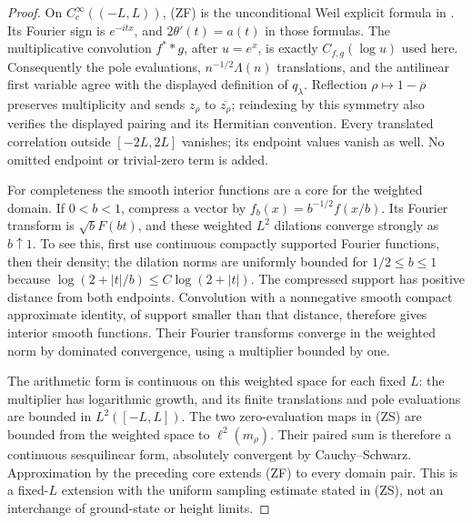 \documentclass[11pt]{article}
\theoremstyle{remark}\newtheorem{remark}[theorem]{Remark}
\begin{document}
\begin{proof}
On $C_c^\infty((-L,L))$, (ZF) is the unconditional Weil
explicit formula in \cite[eqs.~(1.1), (2.2), (2.6),
(2.8)--(2.12), pp.~97, 101--103]{ConnesConsani}.
Its Fourier sign is $e^{-itx}$, and
$2\theta'(t)=a(t)$ in those formulas.
The multiplicative convolution $f^**g$, after $u=e^x$,
is exactly $C_{f,g}(\log u)$ used here. Consequently
the pole evaluations, $n^{-1/2}\Lambda(n)$ translations,
and the antilinear first variable agree with the displayed
definition of $q_\lambda$. Reflection
$\rho\mapsto1-\overline\rho$ preserves multiplicity and sends
$z_\rho$ to $\overline{z_\rho}$; reindexing by this symmetry
also verifies the displayed pairing and its Hermitian convention.
Every translated correlation
outside $[-2L,2L]$ vanishes; its endpoint values vanish
as well. No omitted endpoint or trivial-zero term is added.

For completeness the smooth interior functions are a core
for the weighted domain. If $0<b<1$, compress a vector by
$f_b(x)=b^{-1/2}f(x/b)$. Its Fourier transform is
$\sqrt bF(bt)$, and these weighted $L^2$ dilations converge
strongly as $b\uparrow1$. To see this, first use continuous
compactly supported Fourier functions, then their density;
the dilation norms are uniformly bounded for $1/2\le b\le1$
because $\log(2+|t|/b)\le C\log(2+|t|)$.
The compressed support has positive distance from both
endpoints. Convolution with a nonnegative smooth compact
approximate identity, of support smaller than that distance,
therefore gives interior smooth functions. Their Fourier
transforms converge in the weighted norm by dominated
convergence, using a multiplier bounded by one.

The arithmetic form is continuous on this weighted space
for each fixed $L$: the multiplier has logarithmic growth,
and its finite translations and pole evaluations are bounded
in $L^2([-L,L])$. The two zero-evaluation maps in (ZS) are
bounded from the weighted space to $\ell^2(m_\rho)$.
Their paired sum is therefore a continuous sesquilinear
form, absolutely convergent by Cauchy--Schwarz.
Approximation by the preceding core extends (ZF) to every
domain pair. This is a fixed-$L$ extension with the uniform
sampling estimate stated in (ZS), not an interchange of
ground-state or height limits.
\end{proof}
\end{document}
